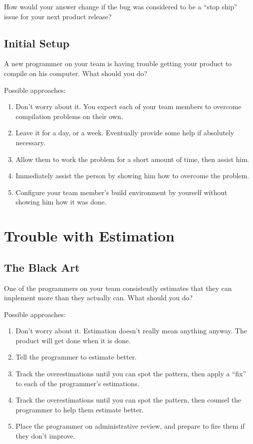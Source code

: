 How would your answer change if the bug was considered to be a ``stop ship'' issue for your next product release?


\subsection{Initial Setup}

A new programmer on your team is having trouble getting your product to compile on his computer. What should you do?

Possible approaches:

\begin{enumerate}
\item Don't worry about it. You expect each of your team members to overcome compilation problems on their own.
\item Leave it for a day, or a week. Eventually provide some help if absolutely necessary.
\item Allow them to work the problem for a short amount of time, then assist him.
\item Immediately assist the person by showing him how to overcome the problem.
\item Configure your team member's build environment by yourself without showing him how it was done.
\end{enumerate}


\section{Trouble with Estimation}

\subsection{The Black Art}

One of the programmers on your team consistently estimates that they can implement more than they actually can. What should you do?

Possible approaches:

\begin{enumerate}
\item Don't worry about it. Estimation doesn't really mean anything anyway. The product will get done when it is done.
\item Tell the programmer to estimate better.
\item Track the overestimations until you can spot the pattern, then apply a ``fix'' to each of the programmer's estimations.
\item Track the overestimations until you can spot the pattern, then counsel the programmer to help them estimate better.
\item Place the programmer on administrative review, and prepare to fire them if they don't improve.
\end{enumerate}


